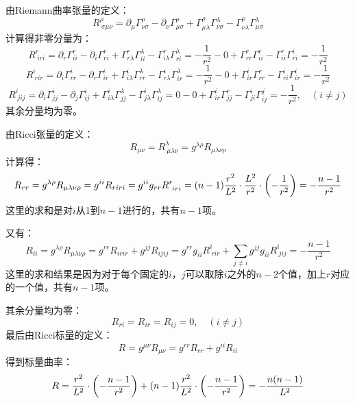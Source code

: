 \documentclass[a4paper]{article}
\begin{document}
\begin{enumerate}
    由Riemann曲率张量的定义：
    \[
        R^\rho_{\ \sigma\mu\nu} = \partial_\mu \Gamma^\rho_{\nu\sigma} - \partial_\nu \Gamma^\rho_{\mu\sigma} + \Gamma^\rho_{\mu\lambda} \Gamma^\lambda_{\nu\sigma} - \Gamma^\rho_{\nu\lambda} \Gamma^\lambda_{\mu\sigma}
    \]
    计算得非零分量为：
    \[
        R^r_{\ iri} = \partial_r \Gamma^r_{ii} - \partial_i \Gamma^r_{ri} + \Gamma^r_{r\lambda} \Gamma^\lambda_{ii} - \Gamma^r_{i\lambda} \Gamma^\lambda_{ri} = -\frac{1}{r^2} - 0 + \Gamma^r_{rr} \Gamma^r_{ii} - \Gamma^r_{ii} \Gamma^i_{ri} = -\frac{1}{r^2}
    \]
    \[
        R^i_{\ rir} = \partial_i \Gamma^i_{rr} - \partial_r \Gamma^i_{ir} + \Gamma^i_{i\lambda} \Gamma^\lambda_{rr} - \Gamma^i_{r\lambda} \Gamma^\lambda_{ir} = -\frac{1}{r^2} - 0 + \Gamma^i_{ir} \Gamma^r_{rr} - \Gamma^i_{ri} \Gamma^i_{ir} = -\frac{1}{r^2}
    \]
    \[
        R^i_{\ jij} = \partial_i \Gamma^i_{jj} - \partial_j \Gamma^i_{ij} + \Gamma^i_{i\lambda} \Gamma^\lambda_{jj} - \Gamma^i_{j\lambda} \Gamma^\lambda_{ij} = 0 - 0 + \Gamma^i_{ir} \Gamma^r_{jj} - \Gamma^i_{ji} \Gamma^j_{ij} = -\frac{1}{r^2},\quad (i \neq j)
    \]
    其余分量均为零。

    由Ricci张量的定义：
    \[
        R_{\mu\nu} = R^\lambda_{\ \mu\lambda\nu} = g^{\lambda\rho} R_{\mu\lambda\nu\rho}
    \]
    计算得：
    \[
        R_{rr} = g^{\lambda\rho} R_{\mu\lambda\nu\rho} = g^{ii} R_{riri} = g^{ii} g_{rr} R^r_{\ iri} = (n-1) \frac{r^2}{L^2} \cdot \frac{L^2}{r^2} \cdot \qty(-\frac{1}{r^2}) = -\frac{n-1}{r^2}
    \]
    这里的求和是对$i$从1到$n-1$进行的，共有$n-1$项。

    又有：
    \[
        R_{ii} = g^{\lambda\rho} R_{\mu\lambda\nu\rho} = g^{rr} R_{irir} + g^{jj} R_{ijij} = g^{rr} g_{ii} R^i_{\ rir} + \sum_{j \neq i} g^{jj} g_{ii} R^i_{\ jij} = -\frac{n-1}{r^2}
    \]
    这里的求和结果是因为对于每个固定的$i$，$j$可以取除$i$之外的$n-2$个值，加上$r$对应的一个值，共有$n-1$项。

    其余分量均为零：
    \[
        R_{ri} = R_{ir} = R_{ij} = 0,\quad (i \neq j)
    \]
    最后由Ricci标量的定义：
    \[
        R = g^{\mu\nu} R_{\mu\nu} = g^{rr} R_{rr} + g^{ii} R_{ii}
    \]
    得到标量曲率：
    \[
        R = \frac{r^2}{L^2} \cdot \qty(-\frac{n-1}{r^2}) + (n-1) \frac{r^2}{L^2} \cdot \qty(-\frac{n-1}{r^2}) = -\frac{n(n-1)}{L^2}
    \]
\end{enumerate}
\end{document}
